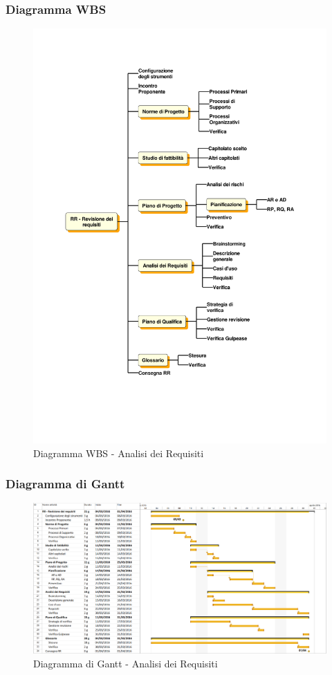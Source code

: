 \subsubsection{Diagramma WBS}
\begin{figure}[H]
	\centering
	\includegraphics[width= 15cm]{immagini/ar_wbs.pdf}
	\caption{Diagramma WBS - Analisi dei Requisiti}
\end{figure}

\subsubsection{Diagramma di Gantt}
\begin{figure}[H]
	\centering
	\includegraphics[width= 15cm]{immagini/ar_gantt.png}
	\caption{Diagramma di Gantt - Analisi dei Requisiti}
\end{figure}
\newpage

